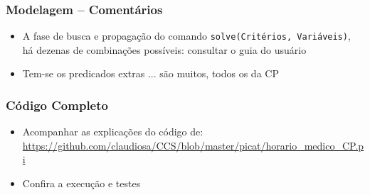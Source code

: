 \documentclass{beamer}
\begin{document}
\begin{frame}[fragile] 

\frametitle{Modelagem -- Comentários}

\begin{itemize}
  \item A fase de busca e propagação do comando 	\texttt{solve(Critérios, Variáveis)}, 
  há dezenas de combinações possíveis: consultar o guia do usuário
  
  
  \item Tem-se os predicados extras ... são muitos, todos os da CP

  
\end{itemize}

\end{frame}

\begin{frame}[fragile]
 \frametitle{Código Completo}

\begin{itemize}
  \item Acompanhar as explicações do código de:\\
\url{https://github.com/claudiosa/CCS/blob/master/picat/horario_medico_CP.pi}

  \item Confira a execução e testes
\end{itemize}
\end{frame}
\end{document}
